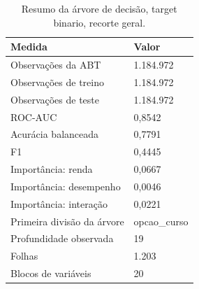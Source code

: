 \begin{table}
\caption{Resumo da árvore de decisão, target binario, recorte geral.}
\label{tab:tabela_treeClassification_binario_recorte_geral_principal_in_sample_e5}
\begin{tabular}{ll}
\toprule
Medida & Valor \\
\midrule
Observações da ABT & 1.184.972 \\
Observações de treino & 1.184.972 \\
Observações de teste & 1.184.972 \\
ROC-AUC & 0,8542 \\
Acurácia balanceada & 0,7791 \\
F1 & 0,4445 \\
Importância: renda & 0,0667 \\
Importância: desempenho & 0,0046 \\
Importância: interação & 0,0221 \\
Primeira divisão da árvore & opcao\_curso \\
Profundidade observada & 19 \\
Folhas & 1.203 \\
Blocos de variáveis & 20 \\
\bottomrule
\end{tabular}
\end{table}
